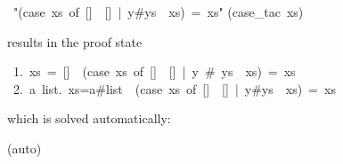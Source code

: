\begin{isabelle}%
\isanewline
{}\ {"}(case\ xs\ of\ []\ {\isasymRightarrow}\ []\ |\ y\#ys\ {\isasymRightarrow}\ xs)\ =\ xs{"}\isanewline
{}(case\_tac\ xs)%
\begin{isamarkuptxt}%
\noindent
results in the proof state
\begin{isabellepar}%
~1.~xs~=~[]~{\isasymLongrightarrow}~(case~xs~of~[]~{\isasymRightarrow}~[]~|~y~\#~ys~{\isasymRightarrow}~xs)~=~xs\isanewline
~2.~{\isasymAnd}a~list.~xs=a\#list~{\isasymLongrightarrow}~(case~xs~of~[]~{\isasymRightarrow}~[]~|~y\#ys~{\isasymRightarrow}~xs)~=~xs%
\end{isabellepar}%
which is solved automatically:%
\end{isamarkuptxt}%
(auto)\isanewline
\end{isabelle}%
